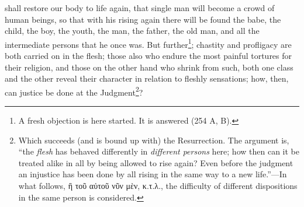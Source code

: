 shall restore our body to life again, that single man will become a crowd of human beings, so that with his rising again there will be found the babe, the child, the boy, the youth, the man, the father, the old man, and all the intermediate persons that he once was. But further\footnote{A fresh objection is here started. It is answered (254 A, B).}; chastity and profligacy are both carried on in the flesh; those also who endure the most painful tortures for their religion, and those on the other hand who shrink from such, both one class and the other reveal their character in relation to fleshly sensations; how, then, can justice be done at the Judgment\footnote{Which succeeds (and is bound up with) the Resurrection. The argument is, “the \emph{flesh} has behaved differently in \emph{different persons} here; how then can it be treated alike in all by being allowed to rise again? Even before the judgment an injustice has been done by all rising in the same way to a new life.”—In what follows, \textgreek{ἢ τοῦ αὐτοῦ νῦν μὲν, κ.τ.λ}., the difficulty of different dispositions in the same person is considered.}?

